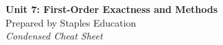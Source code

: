 




\begin{center}
    {\LARGE \bfseries Unit 7: First-Order Exactness and Methods}\\[6pt]
    {\large Prepared by Staples Education}\\[4pt]
    {\itshape Condensed Cheat Sheet}
\end{center}

\vspace{0.4em}

